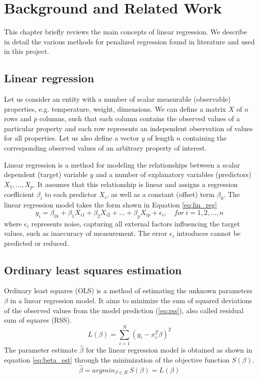 \chapter{Background and Related Work} \label{background}
This chapter briefly reviews the main concepts of linear regression. We describe in detail the various methods for penalized regression found in literature and used in this project.


\section{Linear regression}
Let us consider an entity with a number of scalar measurable (observable) properties, e.g. temperature, weight, dimensions. We can define a matrix $X$ of $n$ rows and $p$ columns, such that each column contains the observed values of a particular property and each row represents an independent observation of values for all properties. Let us also define a vector $y$ of length $n$ containing the corresponding observed values of an arbitrary property of interest.

Linear regression is a method for modeling the relationships between a scalar dependent (target) variable $y$ and a number of explanatory variables (predictors) $X_1,...,X_p$. It assumes that this relationship is linear and assigns a regression coefficient $\beta_i$ to each predictor $X_i$, as well as a constant (offset) term $\beta_0$. The linear regression model takes the form shown in Equation \ref{eq:lin_reg}
\begin{equation} \label{eq:lin_reg}
y_i = \beta_01+\beta_1X_{i1}+\beta_2X_{i2}+...+\beta_pX_{ip}+\epsilon_i, \quad for\ i=1,2,...,n
\end{equation}
where $\epsilon_i$ represents noise, capturing all external factors influencing the target values, such as inaccuracy of measurement. The error $\epsilon_i$ introduces cannot be predicted or reduced.


\section{Ordinary least squares estimation} \label{sec:olse}
Ordinary least squares (OLS) is a method of estimating the unknown parameters $\beta$ in a linear regression model. It aims to minimize the sum of squared deviations of the observed values from the model prediction (\ref{eq:rss}), also called residual sum of squares (RSS).
\begin{equation} \label{eq:rss}
L(\beta) = \sum_{i=1}^{N} (y_i - x_i^T\beta)^2
\end{equation}
The parameter estimate $\hat{\beta}$ for the linear regression model is obtained as shown in equation \ref{eq:beta_est} through the minimization of the objective function $S(\beta)$.
\begin{equation} \label{eq:beta_est}
\hat{\beta} = argmin_{\beta \in R}\ S(\beta) = L(\beta)
\end{equation}



